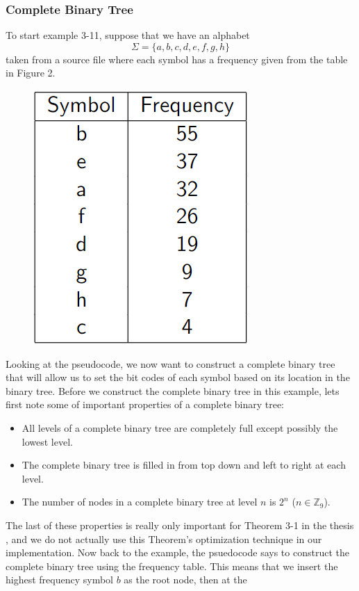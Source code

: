 \documentclass[12pt]{IEEEtran}
\begin{document}
\subsubsection{Complete Binary Tree} 
To start example 3-11, suppose that we have an alphabet 
\[\Sigma = \{a,b,c,d,e,f,g,h\}\]
taken from a source file where each symbol has a frequency
given from the table in Figure 2.
\begin{figure}
\centering
\includegraphics[scale=0.4]{../presentation/images/freqtbl.PNG}
\caption{\cite{Sjostrand}}
\end{figure}
Looking at the pseudocode, we now want to construct a complete binary tree that will allow us to set the bit codes of each
symbol based on its location in the binary tree. Before we construct the complete binary tree in this example, lets first note some of
important properties of a complete binary tree:
\begin{itemize}
\item All levels of a complete binary tree are completely full except possibly the lowest level.
\item The complete binary tree is filled in from top down and left to right at each level.
\item The number of nodes in a complete binary tree at level $n$ is $2^n$ ($n \in \mathbb{Z}_9$).
\end{itemize}
The last of these properties is really only important for Theorem 3-1 in the thesis \cite{Sjostrand}, and we do not actually use
this Theorem's optimization technique in our implementation. Now back to the example, the psuedocode says to construct the complete
binary tree using the frequency table. This means that we insert the highest frequency symbol $b$ as the root node, then at the
\end{document}
